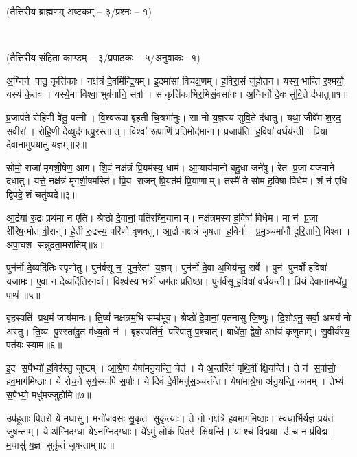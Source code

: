 \centerline{\normalsize(तैत्तिरीय ब्राह्मणम् अष्टकम् -- ३/प्रश्नः -- १)}\mbox{}\\[-2em]
\centerline{\normalsize(तैत्तिरीय संहिता काण्डम् -- ३/प्रपाठकः -- ५/अनुवाकः --१)}

अ॒ग्निर्न॑ पातु॒ कृत्ति॑काः। 
नक्ष॑त्रं दे॒वमि॑न्द्रि॒यम्। 
इ॒दमा॑सां विचक्ष॒णम्। 
ह॒विरा॒सं जु॑होतन। 
यस्य॒ भान्ति॑ र॒श्मयो॒ यस्य॑ के॒तव॑। 
यस्ये॒मा विश्वा॒ भुव॑नानि॒ सर्वा। 
स कृत्ति॑काभि\-र॒भिसं॒वसा॑नः। 
अ॒ग्निर्नो॑ दे॒वः सु॑वि॒ते द॑धातु॥१॥ 

प्र॒जाप॑ते रोहि॒णी वे॑तु॒ पत्नी। 
वि॒श्वरू॑पा बृह॒ती चि॒त्रभा॑नुः। 
सा नो॑ य॒ज्ञस्य॑ सुवि॒ते द॑धातु। 
यथा॒ जीवे॑म श॒रद॒ सवीरा॑। 
रो॒हि॒णी दे॒व्युद॑गात्पु॒रस्तात्। 
विश्वा॑ रू॒पाणि॑ प्रति॒मोद॑माना। 
प्र॒जाप॑ति ह॒विषा॑ व॒र्धय॑न्ती। 
प्रि॒या दे॒वाना॒मुप॑यातु य॒ज्ञम्॥२॥ 

सोमो॒ राजा॑ मृगशी॒\ar{}षेण॒ आग\snn{}। 
शि॒वं नक्ष॑त्रं प्रि॒यम॑स्य॒ धाम॑। 
आ॒प्याय॑मानो बहु॒धा जने॑षु। 
रेत॑ प्र॒जां यज॑माने दधातु। 
यत्ते॒ नक्ष॑त्रं मृगशी॒\ar{}षमस्ति॑। 
प्रि॒य रा॑जन् प्रि॒यत॑मं प्रि॒याणाम्। 
तस्मै॑ ते सोम ह॒विषा॑ विधेम। 
शं न॑ एधि द्वि॒पदे॒ शं चतु॑ष्पदे॥३॥ 

आ॒र्द्रया॑ रु॒द्रः प्रथ॑मा न एति। 
श्रेष्ठो॑ दे॒वानां॒ पति॑रघ्नि॒यानाम्। 
नक्ष॑त्रमस्य ह॒विषा॑ विधेम। 
मा न॑ प्र॒जा री॑रिष॒न्मोत वी॒रान्। 
हे॒ती रु॒द्रस्य॒ परि॑णो वृणक्तु। 
आ॒र्द्रा नक्ष॑त्रं जुषता ह॒विर्न॑। 
प्र॒मु॒ञ्चमा॑नौ दुरि॒तानि॒ विश्वा। 
अपा॒घश सन्नुदता॒मरा॑तिम्॥४॥ 

पुन॑र्नो दे॒व्यदि॑तिः स्पृणोतु। 
पुन॑र्वसू न॒ पुन॒रेतां य॒ज्ञम्। 
पुन॑र्नो दे॒वा अ॒भिय॑न्तु॒ सर्वे। 
पुन॑ पुनर्वो ह॒विषा॑ यजामः। 
ए॒वा न दे॒व्यदि॑तिरन॒र्वा। 
विश्व॑स्य भ॒र्त्री जग॑तः प्रति॒ष्ठा। 
पुन॑र्वसू ह॒विषा॑ व॒र्धय॑न्ती। 
प्रि॒यं दे॒वाना॒मप्ये॑तु॒ पाथ॑॥५॥ 

बृह॒स्पति॑ प्रथ॒मं जाय॑मानः। 
ति॒ष्यं॑ नक्ष॑त्रम॒भि सम्ब॑भूव। 
श्रेष्ठो॑ दे॒वानां॒ पृत॑नासु  जि॒ष्णुः। 
दि॒शोऽनु॒ सर्वा॒ अभ॑यं नो अस्तु। 
ति॒ष्य॑ पु॒रस्ता॑दु॒त म॑ध्य॒तो न॑। 
बृह॒स्पति॑र्न॒ परि॑पातु प॒श्चात्। 
बाधे॑तां॒ द्वेषो॒ अभ॑यं कृणुताम्। 
सु॒वीर्य॑स्य॒ पत॑यः स्याम॥६॥ 

इ॒द स॒र्पेभ्यो॑ ह॒विर॑स्तु॒ जुष्टम्। 
आ॒श्रे॒षा येषा॑मनु॒यन्ति॒ चेत॑। 
ये अ॒न्तरि॑क्षं पृथि॒वीं क्षि॒यन्ति॑। 
ते न॑ स॒र्पासो॒ हव॒माग॑मिष्ठाः। 
ये रो॑च॒ने सूर्य॒स्यापि॑ स॒र्पाः। 
ये दिवं॑ दे॒वीमनु॑स॒ञ्चर॑न्ति। 
येषा॑माश्रे॒षा अ॑नु॒यन्ति॒ कामम्। 
तेभ्य॑ स॒र्पेभ्यो॒ मधु॑मज्जुहोमि॥७॥ 

उप॑हूताः पि॒तरो॒ ये म॒घासु॑। 
मनो॑जवसः सु॒कृत॑ सुकृ॒त्याः। 
ते नो॒ नक्ष॑त्रे॒ हव॒माग॑मिष्ठाः। 
स्व॒धाभि॑र्य॒ज्ञं प्रय॑तं जुषन्ताम्। 
ये अ॑ग्निद॒ग्धा येऽन॑ग्निदग्धाः। 
ये॑ऽमुं लो॒कं पि॒तर॑ क्षि॒यन्ति॑। 
याश्च॑ वि॒द्मया उ॑ च॒ न प्र॑वि॒द्म। 
म॒घासु॑ य॒ज्ञ सुकृ॑तं जुषन्ताम्॥८॥ 

